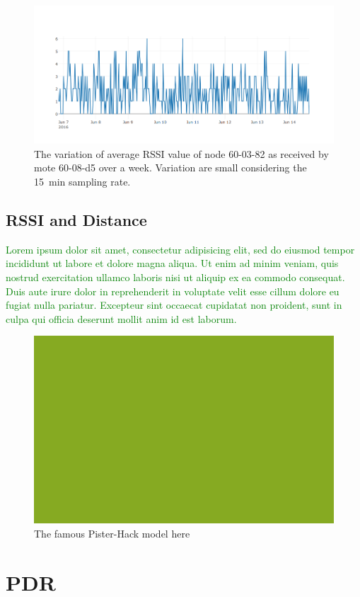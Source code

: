 \documentclass{sig-alternate}
\newcommand{\lorem}               {\textcolor{green}{Lorem ipsum dolor sit amet, consectetur adipisicing elit, sed do eiusmod tempor incididunt ut labore et dolore magna aliqua. Ut enim ad minim veniam, quis nostrud exercitation ullamco laboris nisi ut aliquip ex ea commodo consequat. Duis aute irure dolor in reprehenderit in voluptate velit esse cillum dolore eu fugiat nulla pariatur. Excepteur sint occaecat cupidatat non proident, sunt in culpa qui officia deserunt mollit anim id est laborum.}}
\begin{document}
\begin{figure}
    \centering
    \includegraphics[width=\columnwidth]{rssi_variation}
    \caption{The variation of average RSSI value of node 60-03-82 as received by mote 60-08-d5 over a week. Variation are small considering the 15~min sampling rate.}
    \label{fig:rssi_variation}
\end{figure}

\subsection{RSSI and Distance}

\lorem

\begin{figure}
    \centering
    \includegraphics[width=\columnwidth]{fake}
    \caption{The famous Pister-Hack model here}
    \label{fig:rssi_dist}
\end{figure}

\section{PDR}
\label{sec:pdr}
\end{document}
